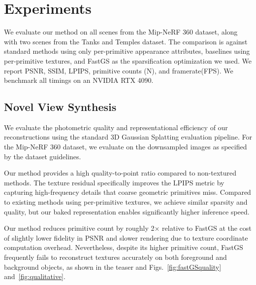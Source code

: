 \documentclass[acmtog,anonymous,review]{acmart}
\begin{document}
\section{Experiments}
We evaluate our method on all scenes from the Mip-NeRF 360 dataset, along with two scenes from the Tanks and Temples \cite{NN} dataset. The comparison is against standard methods using only per-primitive appearance attributes, baselines using per-primitive textures, and FastGS as the sparsification optimization we used. We report PSNR, SSIM, LPIPS, primitive counts (N), and framerate(FPS). We benchmark all timings on an NVIDIA RTX 4090.


\subsection{Novel View Synthesis}
We evaluate the photometric quality and representational efficiency of our reconstructions using the standard 3D Gaussian Splatting evaluation pipeline. For the Mip-NeRF 360 dataset, we evaluate on the downsampled images as specified by the dataset guidelines.

Our method provides a high quality-to-point ratio compared to non-textured methods. The texture residual specifically improves the LPIPS metric by capturing high-frequency details that coarse geometric primitives miss. Compared to existing methods using per-primitive textures, we achieve similar sparsity and quality, but our baked representation enables significantly higher inference speed.

Our method reduces primitive count by roughly 2× relative to FastGS at the cost of slightly lower fidelity in PSNR and slower rendering due to texture coordinate computation overhead. Nevertheless, despite its higher primitive count, FastGS frequently fails to reconstruct textures accurately on both foreground and background objects, as shown in the teaser and Figs.~\ref{fig:fastGSquality} and~\ref{fig:qualitative}.

\end{document}
